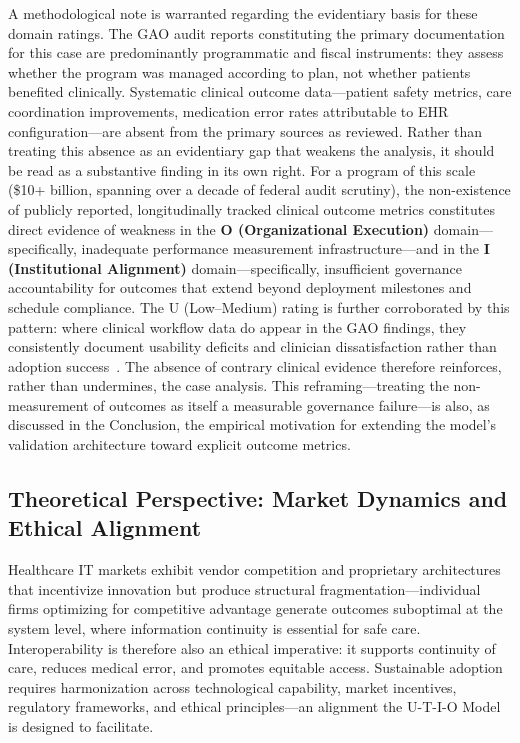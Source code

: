 A methodological note is warranted regarding the evidentiary basis for these domain ratings. The GAO audit reports constituting the primary documentation for this case are predominantly programmatic and fiscal instruments: they assess whether the program was managed according to plan, not whether patients benefited clinically. Systematic clinical outcome data—patient safety metrics, care coordination improvements, medication error rates attributable to EHR configuration—are absent from the primary sources as reviewed. Rather than treating this absence as an evidentiary gap that weakens the analysis, it should be read as a substantive finding in its own right. For a program of this scale (\$10+ billion, spanning over a decade of federal audit scrutiny), the non-existence of publicly reported, longitudinally tracked clinical outcome metrics constitutes direct evidence of weakness in the \textbf{O (Organizational Execution)} domain—specifically, inadequate performance measurement infrastructure—and in the \textbf{I (Institutional Alignment)} domain—specifically, insufficient governance accountability for outcomes that extend beyond deployment milestones and schedule compliance. The U (Low--Medium) rating is further corroborated by this pattern: where clinical workflow data do appear in the GAO findings, they consistently document usability deficits and clinician dissatisfaction rather than adoption success~\cite{gao2025vaehr,gao2024dodehr}. The absence of contrary clinical evidence therefore reinforces, rather than undermines, the case analysis. This reframing—treating the non-measurement of outcomes as itself a measurable governance failure—is also, as discussed in the Conclusion, the empirical motivation for extending the model's validation architecture toward explicit outcome metrics.

\subsection{Theoretical Perspective: Market Dynamics and Ethical Alignment}

Healthcare IT markets exhibit vendor competition and proprietary architectures that incentivize innovation but produce structural fragmentation—individual firms optimizing for competitive advantage generate outcomes suboptimal at the system level, where information continuity is essential for safe care. Interoperability is therefore also an ethical imperative: it supports continuity of care, reduces medical error, and promotes equitable access. Sustainable adoption requires harmonization across technological capability, market incentives, regulatory frameworks, and ethical principles—an alignment the U-T-I-O Model is designed to facilitate.

